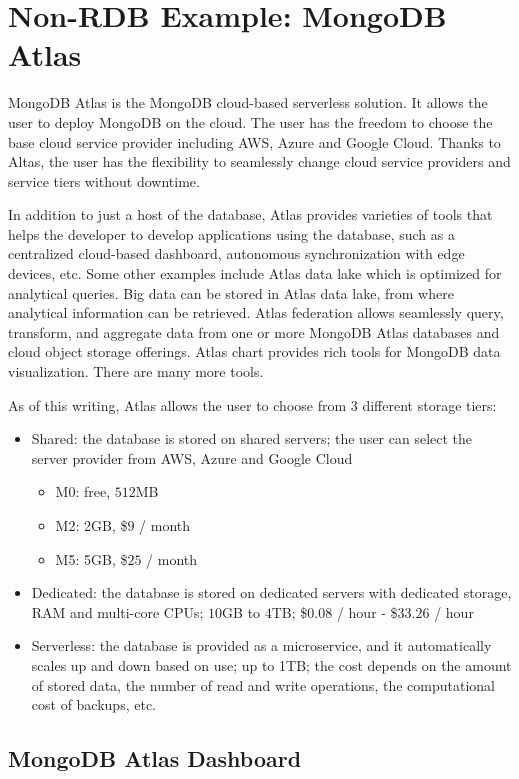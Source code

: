 \section{Non-RDB Example: MongoDB Atlas}

MongoDB Atlas is the MongoDB cloud-based serverless solution. It allows the user to deploy MongoDB on the cloud. The user has the freedom to choose the base cloud service provider including AWS, Azure and Google Cloud. Thanks to Altas, the user has the flexibility to seamlessly change cloud service providers and service tiers without downtime. 

In addition to just a host of the database, Atlas provides varieties of tools that helps the developer to develop applications using the database, such as a centralized cloud-based dashboard, autonomous synchronization with edge devices, etc. Some other examples include Atlas data lake which is optimized for analytical queries. Big data can be stored in Atlas data lake, from where analytical information can be retrieved. Atlas federation allows seamlessly query, transform, and aggregate data from one or more MongoDB Atlas databases and cloud object storage offerings. Atlas chart provides rich tools for MongoDB data visualization. There are many more tools.

As of this writing, Atlas allows the user to choose from 3 different storage tiers:
\begin{itemize}
  \item Shared: the database is stored on shared servers; the user can select the server provider from AWS, Azure and Google Cloud
  \begin{itemize}
    \item M0: free, $512$MB
    \item M2: 2GB, \$$9$ / month
    \item M5: 5GB, \$$25$ / month
  \end{itemize}
  \item Dedicated: the database is stored on dedicated servers with dedicated storage, RAM and multi-core CPUs; $10$GB to $4$TB; \$$0.08$ / hour - \$$33.26$ / hour
  \item Serverless: the database is provided as a microservice, and it automatically scales up and down based on use; up to 1TB; the cost depends on the amount of stored data, the number of read and write operations, the computational cost of backups, etc.
\end{itemize}

\subsection{MongoDB Atlas Dashboard}

